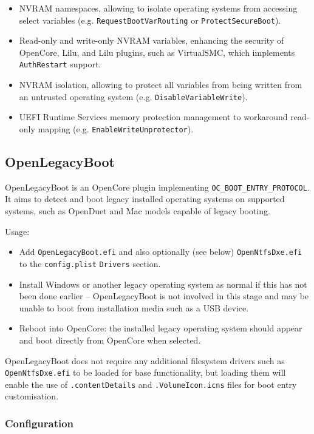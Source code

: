 \documentclass[]{article}
\providecommand{\tightlist}{%
  \setlength{\itemsep}{0pt}\setlength{\parskip}{0pt}}
\begin{document}
\begin{itemize}
  \item NVRAM namespaces, allowing to isolate operating systems from accessing select
  variables (e.g. \texttt{RequestBootVarRouting} or \texttt{ProtectSecureBoot}).
  \item Read-only and write-only NVRAM variables, enhancing the security of OpenCore,
  Lilu, and Lilu plugins, such as VirtualSMC, which implements \texttt{AuthRestart} support.
  \item NVRAM isolation, allowing to protect all variables from being written from
  an untrusted operating system (e.g. \texttt{DisableVariableWrite}).
  \item UEFI Runtime Services memory protection management to workaround read-only
  mapping (e.g. \texttt{EnableWriteUnprotector}).
\end{itemize}

\subsection{OpenLegacyBoot}\label{legacyboot}
OpenLegacyBoot is an OpenCore plugin implementing \texttt{OC\_BOOT\_ENTRY\_PROTOCOL}.
It aims to detect and boot legacy installed operating systems on supported systems, such as
OpenDuet and Mac models capable of legacy booting.

Usage:

\begin{itemize}
\tightlist
  \item Add \texttt{OpenLegacyBoot.efi} and also optionally (see below) \texttt{OpenNtfsDxe.efi} to the \texttt{config.plist}
  \texttt{Drivers} section.
  \item Install Windows or another legacy operating system as normal if this has not been done earlier -- OpenLegacyBoot is
  not involved in this stage and may be unable to boot from installation media such as a USB device.
  \item Reboot into OpenCore: the installed legacy operating system should appear and boot directly from OpenCore
  when selected.
\end{itemize}

OpenLegacyBoot does not require any additional filesystem drivers such as \texttt{OpenNtfsDxe.efi} to be loaded for
base functionality, but loading them will enable the use of \texttt{.contentDetails} and \texttt{.VolumeIcon.icns}
files for boot entry customisation.

\subsubsection{Configuration}
\end{document}
